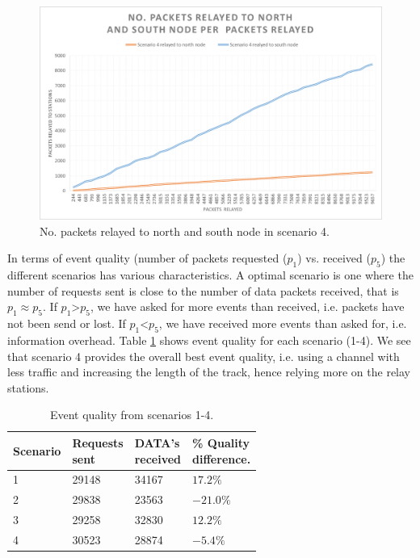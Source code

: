\begin{figure}[H]
	\centering
	\includegraphics[width=1\linewidth]{results/NoPacketsRelayedScenario4}
	\caption{No. packets relayed to north and south node in scenario 4.}
	\label{fig:nopacketsrelayedscenario4}
\end{figure}

\noindent In terms of event quality (number of packets requested ($p_1$) vs. received ($p_5$) the different scenarios has various characteristics. A optimal scenario is one where the number of requests sent is close to the number of data packets received, that is $p_1 \approx p_5$. If $p_1$>$p_5$, we have asked for more events than received, i.e. packets have not been send or lost. If $p_1$<$p_5$, we have received more events than asked for, i.e. information overhead. Table \ref{table:eventquality} shows event quality for each scenario (1-4). We see that scenario 4 provides the overall best event quality, i.e. using a channel with less traffic and increasing the length of the track, hence relying more on the relay stations.

\begin{table}[h]
	\centering
	\begin{tabular}{|l|l|l|l|} \hline
		Scenario & \pbox{4cm}{Requests \\ sent} & \pbox{18cm}{DATA's \\ received} & \pbox{18cm}{\% Quality \\ difference.} \\ \hline
		1 & 29148 & 34167 & $17.2\%$ \\ \hline
		2 & 29838 & 23563 & $-21.0\%$ \\ \hline
		3 & 29258 & 32830 & $12.2\%$ \\ \hline
		4 & 30523 & 28874 & $-5.4\%$ \\ \hline
	\end{tabular}
	\caption{Event quality from scenarios 1-4.}
	\label{table:eventquality}
\end{table}


